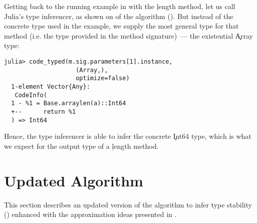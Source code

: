 Getting back to the running example in  with the
\c{length} method, let us call Julia's type inferencer, as
shown on  of the algorithm (). But
instead of the concrete type used in the example, we supply the most general type
for that method (i.e. the type provided in the method signature)~--- the
existential \c{Array} type:
\begin{lstlisting}[style=jterm]
  julia> code_typed(m.sig.parameters[1].instance,
                    (Array,),
                    optimize=false)
  1-element Vector{Any}:
   CodeInfo(
  1 - %1 = Base.arraylen(a)::Int64
  +--      return %1
  ) => Int64
\end{lstlisting}
Hence, the type inferencer is able to infer the concrete \c{Int64} type, which
is what we expect for the output type of a \c{length} method.

\section{Updated Algorithm} %
\label{sec:approx:algo-final}

This section describes an updated version of the algorithm to infer type
stability () enhanced with the approximation ideas
presented in .

